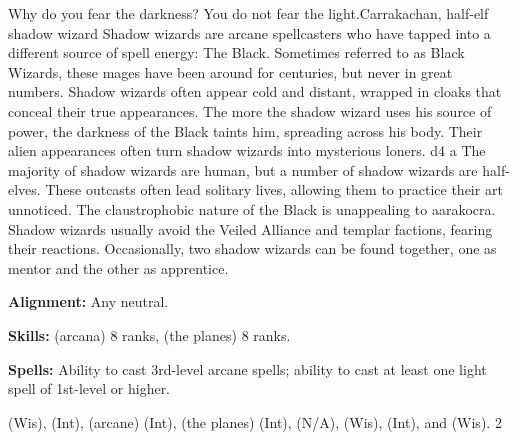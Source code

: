 {Why do you fear the darkness? You do not fear the light.}{Carrakachan, half-elf shadow wizard}
{Shadow wizards are arcane spellcasters who have tapped into a different source of spell energy: The Black. Sometimes referred to as Black Wizards, these mages have been around for centuries, but never in great numbers. Shadow wizards often appear cold and distant, wrapped in cloaks that conceal their true appearances. The more the shadow wizard uses his source of power, the darkness of the Black taints him, spreading across his body. Their alien appearances often turn shadow wizards into mysterious loners.}
{d4}
{a}
{The majority of shadow wizards are human, but a number of shadow wizards are half-elves. These outcasts often lead solitary lives, allowing them to practice their art unnoticed. The claustrophobic nature of the Black is unappealing to aarakocra. Shadow wizards usually avoid the Veiled Alliance and templar factions, fearing their reactions. Occasionally, two shadow wizards can be found together, one as mentor and the other as apprentice.}
{
\textbf{Alignment:} Any neutral.

\textbf{Skills:}  (arcana) 8 ranks,  (the planes) 8 ranks.

\textbf{Spells:} Ability to cast 3rd-level arcane spells; ability to cast at least one light spell of 1st-level or higher.
}
{
 (Wis),  (Int),  (arcane) (Int),  (the planes) (Int),  (N/A),  (Wis),  (Int), and  (Wis).
}
{2}
